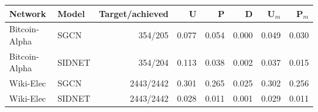 \begin{tabular}{@{}llrrrrrr@{}}
\toprule
Network & Model & Target/achieved & U & P & D & U$_m$ & P$_m$ \\
\midrule
Bitcoin-Alpha & SGCN & 354/205 & 0.077 & 0.054 & 0.000 & 0.049 & 0.030 \\
Bitcoin-Alpha & SIDNET & 354/204 & 0.113 & 0.038 & 0.002 & 0.037 & 0.015 \\
Wiki-Elec & SGCN & 2443/2442 & 0.301 & 0.265 & 0.025 & 0.302 & 0.256 \\
Wiki-Elec & SIDNET & 2443/2442 & 0.028 & 0.011 & 0.001 & 0.029 & 0.011 \\
\bottomrule
\end{tabular}
